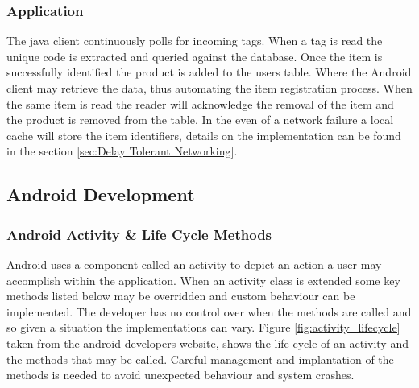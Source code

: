 \documentclass[a4paper, 11pt]{article}
\begin{document}
\subsubsection{Application} 
The java client continuously polls for incoming tags. When a tag is read the unique code is extracted and queried against the database. Once the item is successfully identified the product is added to the users table. Where the Android client may retrieve the data, thus automating the item registration process. When the same item is read the reader will acknowledge the removal of the item and the product is removed from the table.
In the even of a network failure a local cache will store the item identifiers, details on the implementation can be found in the section \ref{sec:Delay Tolerant Networking}.

\vspace{\baselineskip}

\subsection{Android Development} 

\subsubsection{Android Activity \& Life Cycle Methods}
Android uses a component called an activity to depict an action a user may accomplish within the application. When an activity class is extended some key methods listed below may be overridden and custom behaviour can be implemented. The developer has no control over when the methods are called and so given a situation the implementations can vary. Figure \ref{fig:activity_lifecycle} taken from the android developers website, shows the life cycle of an activity and the methods that may be called. Careful management and implantation of the methods is needed to avoid unexpected behaviour and system crashes.
\end{document}
